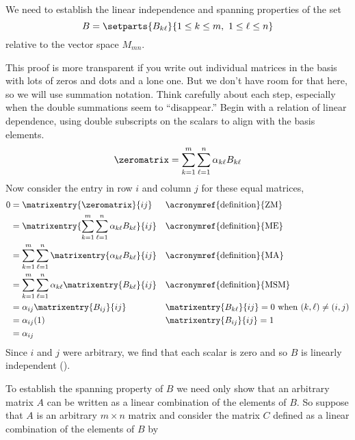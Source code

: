 We need to establish the linear independence and spanning properties of the set
%
\begin{equation*}
B=\setparts{B_{k\ell}}{1\leq k\leq m,\ 1\leq\ell\leq n}
\end{equation*}
%
relative to the vector space $M_{mn}$.\par
%
This proof is more transparent if you write out individual matrices in the basis with lots of zeros and dots and a lone one.  But we don't have room for that here, so we will use summation notation.  Think carefully about each step, especially when the double summations seem to ``disappear.''  Begin with a relation of linear dependence, using double subscripts on the scalars to align with the basis elements.
%
\begin{equation*}
\zeromatrix=\sum_{k=1}^{m}\sum_{\ell=1}^{n}\alpha_{k\ell}B_{k\ell}
\end{equation*}
%
Now consider the entry in row $i$ and column $j$ for these equal matrices,
%
\begin{align*}
0
&=\matrixentry{\zeromatrix}{ij}&&\text{\acronymref{definition}{ZM}}\\
%
&=\matrixentry{\sum_{k=1}^{m}\sum_{\ell=1}^{n}\alpha_{k\ell}B_{k\ell}}{ij}
&&\text{\acronymref{definition}{ME}}\\
%
&=\sum_{k=1}^{m}\sum_{\ell=1}^{n}\matrixentry{\alpha_{k\ell}B_{k\ell}}{ij}
&&\text{\acronymref{definition}{MA}}\\
%
&=\sum_{k=1}^{m}\sum_{\ell=1}^{n}\alpha_{k\ell}\matrixentry{B_{k\ell}}{ij}
&&\text{\acronymref{definition}{MSM}}\\
%
&=\alpha_{ij}\matrixentry{B_{ij}}{ij}&&
\text{$\matrixentry{B_{k\ell}}{ij}=0$ when $(k,\ell)\neq(i,j)$}\\
%
&=\alpha_{ij}(1)&&\text{$\matrixentry{B_{ij}}{ij}=1$}\\
%
&=\alpha_{ij}
\end{align*}
%
Since $i$ and $j$ were arbitrary, we find that each scalar is zero and so $B$ is linearly independent ().\par
%
To establish the spanning property of $B$ we need only show that an arbitrary matrix $A$ can be written as a linear combination of the elements of $B$.  So suppose that $A$ is an arbitrary $m\times n$ matrix and consider the matrix $C$ defined as a linear combination of the elements of $B$ by 

